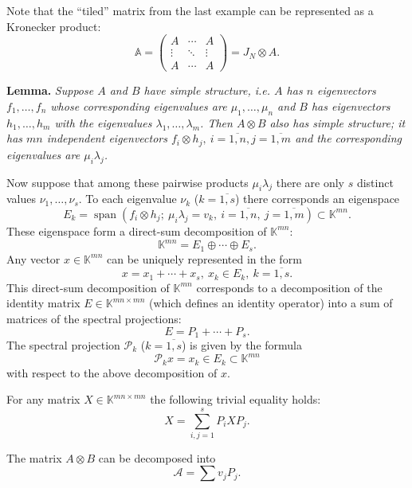 \documentclass[a4paper]{jpconf}
\begin{document}
Note that the ``tiled'' matrix from the last example
    can be represented as a Kronecker product:
\[
    \mathbb{A} =
    \begin{pmatrix}
    A & \cdots & A\\
    \vdots & \ddots & \vdots \\
    A & \cdots & A\end{pmatrix} =
        J_N\otimes A.
    \]

\begin{center}
\textbf{Lemma.}
{\it
Suppose \( A \) and \( B \) have simple structure,
    i.e. \( A \) has \( n \) eigenvectors
    \( f_1, \ldots, f_n \)
    whose corresponding eigenvalues are \( \mu_1, \ldots, \mu_n \)
    and \( B \) has eigenvectors \( h_1, \ldots, h_m \)
    with the eigenvalues \( \lambda_1, \ldots, \lambda_m \).
Then \( A\otimes B \) also has simple structure;
    it has \( mn \) independent eigenvectors \( f_i\otimes h_j,\ i{=}\overline{1,n}, j{=}\overline{1,m} \)
    and the corresponding eigenvalues are \( \mu_i \lambda_j \).
\/}
\end{center}


Now suppose that among these pairwise products \( \mu_i \lambda_j \)
    there are only \( s \) distinct values \( \nu_1, \ldots, \nu_s \).
To each eigenvalue \( \nu_k \) (\( k{=}\overline{1,s} \)) there corresponds
    an eigenspace \[ E_k = \operatorname{span}(f_i\otimes h_j;\ \mu_i\lambda_j = v_k,\ i{=}\overline{1,n},\ j{=}\overline{1,m}) \subset \mathbb{K}^{mn}. \]
These eigenspace form a direct-sum decomposition of \( \mathbb{K}^{mn} \):
    \[ \mathbb{K}^{mn} = E_1 \oplus \cdots \oplus E_s. \]
Any vector \( x\in\mathbb{K}^{mn} \) can be uniquely represented
    in the form
    \[
        x = x_1 + \cdots + x_s,\ x_k\in E_k,\ k=\overline{1,s}.
    \]
This direct-sum decomposition of \( \mathbb{K}^{mn} \)
    corresponds to a decomposition of the identity matrix \( E\in \mathbb{K}^{mn{\times}mn} \)
    (which defines an identity operator)
    into a sum of matrices of the spectral projections:
    \[
        E = P_1 + \cdots + P_s.
    \]
The spectral projection \( \mathcal{P}_k \) (\(k{=}\overline{1,s}\)) is given by the formula
    \[
        \mathcal{P}_k x = x_k \in E_k\subset \mathbb{K}^{mn}
    \]
    with respect to the above decomposition of \( x \).

For any matrix \( X\in \mathbb{K}^{mn{\times}mn} \)
    the following trivial equality holds:
    \[
        X = \sum_{i,j=1}^s P_i X P_j.
    \]

The matrix \( A\otimes B \) can be decomposed into
    \[
        \mathcal{A} = \sum v_j P_j.
    \]
\end{document}
